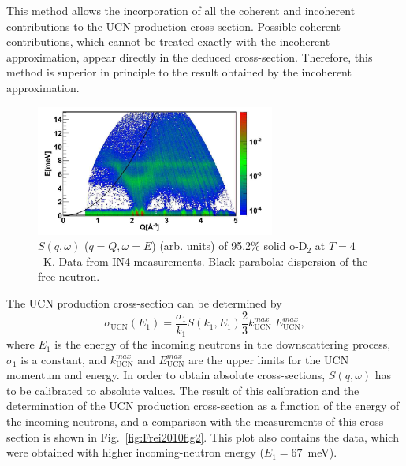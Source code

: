 This method allows the incorporation of all the coherent and
incoherent contributions to the UCN production cross-section. Possible
coherent contributions, which cannot be treated exactly with the
incoherent approximation, appear directly in the deduced
cross-section. Therefore, this method is superior in principle to the
result obtained by the incoherent approximation.

\begin{figure}[h!]
\begin{center}
   \includegraphics[width=0.7\textwidth]{sD2_S.PNG} \caption{\cite{Frei2010}
    $S(q,\omega)$ ($q=Q ,\omega=E$) (arb. units) of 95.2\% solid
    o-D$_2$ at $T=4$~K. Data from IN4 measurements. Black parabola:
    dispersion of the free neutron. }
    \label{fig:sD2_S}
    \end{center}
\end{figure} 



The UCN production cross-section can be determined by
\begin{equation}
\sigma_{\text{UCN}}(E_1)=\frac{\sigma_1}{k_1} S(k_1, E_1) \frac{2}{3} k_{\text{UCN}}^{max} \; E_{\text{UCN}}^{max} ,
\end{equation}
where $E_1$ is the energy of the incoming neutrons in the
downscattering process, $\sigma_1$ is a constant, and
$k_{\text{UCN}}^{max}$ and $E_{\text{UCN}}^{max} $ are the upper
limits for the UCN momentum and energy.  In order to obtain absolute
cross-sections, $S(q,\omega)$ has to be calibrated to absolute values.
The result of this calibration and the determination of the UCN
production cross-section as a function of the energy of the incoming
neutrons, and a comparison with the measurements of this cross-section
is shown in Fig.~\ref{fig:Frei2010fig2}. This plot also contains the
data, which were obtained with higher incoming-neutron energy
($E_1=67$~meV).


